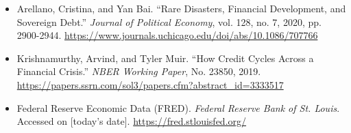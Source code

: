 \documentclass[11pt]{article}
\begin{document}
\begin{itemize}
  \item Arellano, Cristina, and Yan Bai. ``Rare Disasters, Financial Development, and Sovereign Debt.'' \emph{Journal of Political Economy}, vol. 128, no. 7, 2020, pp. 2900-2944. \url{https://www.journals.uchicago.edu/doi/abs/10.1086/707766}
  \item Krishnamurthy, Arvind, and Tyler Muir. ``How Credit Cycles Across a Financial Crisis.'' \emph{NBER Working Paper}, No. 23850, 2019. \url{https://papers.ssrn.com/sol3/papers.cfm?abstract_id=3333517}

  \item Federal Reserve Economic Data (FRED). \emph{Federal Reserve Bank of St. Louis}. Accessed on [today's date]. \url{https://fred.stlouisfed.org/}
\end{itemize}
\end{document}
